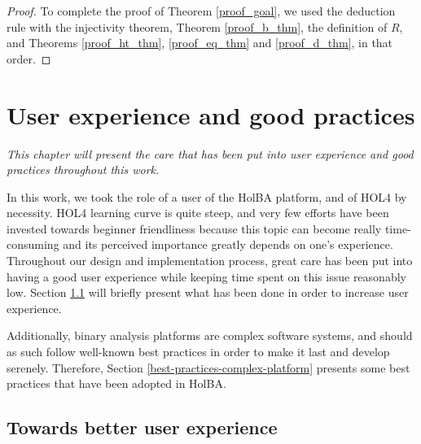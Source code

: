 \documentclass[10pt,a4paper]{article}
\begin{document}
\begin{multicols}{2}
\begin{proof}
To complete the proof of Theorem \ref{proof_goal}, we used the deduction rule with the injectivity theorem, Theorem \ref{proof_b_thm}, the definition of $R$, and Theorems \ref{proof_ht_thm}, \ref{proof_eq_thm} and \ref{proof_d_thm}, in that order.
  
\end{proof}









































\section{User experience and good practices} \label{user-friendliness}
\textit{This chapter will present the care that has been put into user experience and good practices throughout this work.}

In this work, we took the role of a user of the HolBA platform, and of HOL4 by necessity. HOL4 learning curve is quite steep, and very few efforts have been invested towards beginner friendliness because this topic can become really time-consuming and its perceived importance greatly depends on one's experience. Throughout our design and implementation process, great care has been put into having a good user experience while keeping time spent on this issue reasonably low. Section \ref{towards-user-exp} will briefly present what has been done in order to increase user experience.

Additionally, binary analysis platforms are complex software systems, and should as such follow well-known best practices in order to make it last and develop serenely. Therefore, Section \ref{best-practices-complex-platform} presents some best practices that have been adopted in HolBA.

\subsection{Towards better user experience} \label{towards-user-exp}

\end{multicols}
\end{document}
